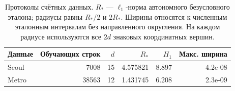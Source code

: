\begin{table}[htbp]
\centering\small
\caption{Протоколы счётных данных. $R_*$ — $\ell_1$-норма автономного безусловного эталона; радиусы равны $R_*/2$ и $2R_*$. Ширины относятся к численным эталонным интервалам без направленного округления. На каждом радиусе используются все $2d$ знаковых координатных вершин.}
\label{tab:data}
\begin{tabular}{lrrrrr}
\toprule
Данные & Обучающих строк & $d$ & $R_*$ & $H_1$ & Макс. ширина \\
\midrule
Seoul & 7008 & 15 & 4.575821 & 8.897 & 4.2e-08 \\
Metro & 38563 & 12 & 1.431745 & 6.208 & 2.3e-09 \\
\bottomrule
\end{tabular}
\end{table}
